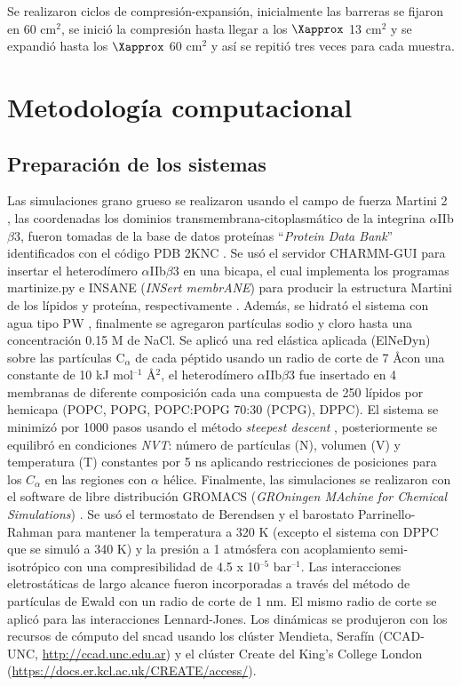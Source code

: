 Se realizaron ciclos de compresión-expansión, inicialmente las barreras se fijaron en 60 cm$^2$, se inició la compresión hasta llegar a los $\Xapprox$ 13 cm$^2$ y se expandió hasta los $\Xapprox$ 60 cm$^2$ y así se repitió tres veces para cada muestra.

\section{Metodología computacional}

\subsection{Preparación de los sistemas}

Las simulaciones grano grueso se realizaron usando el campo de fuerza Martini 2 \citep{DeJong2013}, las coordenadas los dominios transmembrana-citoplasmático de la integrina $\alpha$IIb$\beta$3,  fueron tomadas de la base de datos proteínas ``\textit{Protein Data Bank}'' identificados con el código PDB 2KNC \citep{Yang2009}. Se usó el servidor CHARMM-GUI \citep{Wu2014} para insertar el heterodímero $\alpha$IIb$\beta$3 en una bicapa, el cual implementa los programas martinize.py \citep{DeJong2013} e INSANE (\textit{INSert membrANE}) para producir la estructura Martini de los lípidos y proteína, respectivamente \citep{Wassenaar2015}. Además, se hidrató el sistema con agua tipo PW \citep{Yesylevskyy2010}, finalmente se agregaron partículas sodio y cloro hasta una concentración 0.15 M de NaCl. Se aplicó una red elástica aplicada (ElNeDyn) \citep{Periole2009} sobre las partículas C$_\alpha$ de cada péptido usando un radio de corte de 7 \AA con una constante de 10 kJ mol$^{\text{--1}}$ \AA $^{2}$, el heterodímero $\alpha$IIb$\beta$3  fue insertado en 4 membranas de diferente composición cada una compuesta de 250 lípidos por hemicapa (POPC, POPG, POPC:POPG 70:30 (PCPG), DPPC). El sistema se minimizó por 1000 pasos usando el método \textit{steepest descent} \citep{Haug1976}, posteriormente se equilibró en condiciones \textit{NVT}: número de partículas (N), volumen (V) y temperatura (T) constantes  por 5 ns aplicando restricciones de posiciones para los $C_\alpha$ en las regiones con $\alpha$ hélice. Finalmente, las simulaciones  se realizaron con el software de libre distribución GROMACS (\textit{GROningen MAchine for Chemical Simulations}) \citep{Lindahl2019}. Se usó el termostato de Berendsen \citep{Berendsen1984} y el barostato Parrinello-Rahman \citep{Parrinello1981} para mantener la temperatura a 320 K (excepto el sistema con DPPC que se simuló a 340 K) y la presión a 1 atmósfera con acoplamiento semi-isotrópico con una compresibilidad de 4.5 x 10$^{\text{--5}}$ bar$^{\text{--1}}$. Las interacciones eletrostáticas de largo alcance fueron incorporadas a través del método de partículas de  Ewald con un radio de corte de 1 nm. El mismo radio de corte se aplicó para las interacciones Lennard-Jones.
Los dinámicas se produjeron con los recursos de cómputo del \ac{sncad} usando los clúster Mendieta, Serafín (CCAD-UNC, \href{http://ccad.unc.edu.ar}{http://ccad.unc.edu.ar}) y el clúster Create del King’s College London (\href{https://docs.er.kcl.ac.uk/CREATE/access/}{https://docs.er.kcl.ac.uk/CREATE/access/}). 

